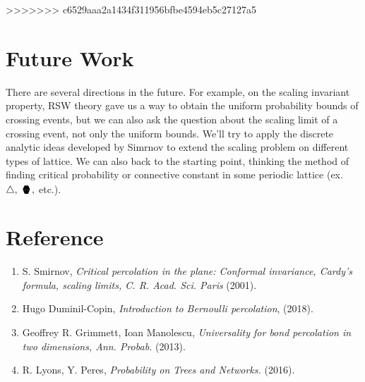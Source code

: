 \documentclass[12pt]{article}
\newcommand{\sixedge}{\mbox{\parbox[t][-2pt][c]{10pt}{\scriptsize$\blacktriangledown\hspace{-3.6pt}\blacktriangle\hspace{-4pt}\blacktriangledown$}\hspace{-10.2pt}\parbox[b][10.7pt][c]{10pt}{\scriptsize$\blacktriangle\hspace{-3.6pt}\blacktriangledown\hspace{-3.6pt}\blacktriangle$}}}
\theoremstyle{plane}
\theoremstyle{definition}
\begin{document}
\newpage
>>>>>>> c6529aaa2a1434f311956bfbe4594eb5c27127a5
\section{Future Work}

There are several directions in the future. For example, on the scaling invariant property, RSW theory gave us a way to obtain the uniform probability bounds of crossing events, but we can also ask the question about the scaling limit of a crossing event, not only the uniform bounds. We'll try to apply the discrete analytic ideas developed by Simrnov to extend the scaling problem on different types of lattice.
We can also back to the starting point, thinking the method of finding critical probability or connective constant in some periodic lattice (ex. $\triangle,\ \sixedge,$ etc.). 


\section*{Reference}

\begin{enumerate}
\item S. Smirnov, \textit{Critical percolation in the plane: Conformal invariance, Cardy's formula, scaling limits, C. R. Acad. Sci. Paris} (2001).
\item Hugo Duminil-Copin, \textit{Introduction to Bernoulli percolation}, (2018).
\item Geoffrey R. Grimmett, Ioan Manolescu, \textit{Universality for bond percolation in two dimensions, Ann. Probab.} (2013).
\item R. Lyons, Y. Peres, \textit{Probability on Trees and Networks.} (2016).
\end{enumerate}
\end{document}
